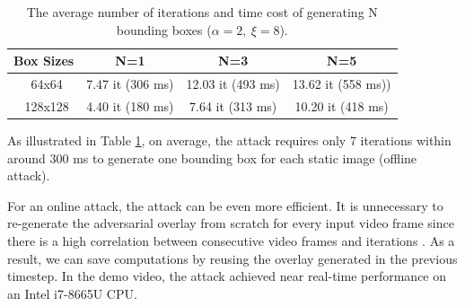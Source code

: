 \begin{table}[H]
    \centering
    \begin{tabular}{cccc}
    \hline
    Box Sizes & N=1 & N=3 & N=5\\
    \hline
    \ 64x64    & 7.47 it (306 ms)  & 12.03 it (493 ms) &  13.62 it (558 ms)) \\
    \ 128x128  & 4.40 it (180 ms)  & 7.64 it (313 ms) & 10.20 it (418 ms) \\
    \hline
    \end{tabular}
    \caption{The average number of iterations and time cost of generating N bounding boxes ($\alpha=2,\ \xi=8$).}
    \label{tab:fix-box}
\end{table}

As illustrated in Table \ref{tab:fix-box}, on average, the attack requires only 7 iterations within around 300 ms to generate one bounding box for each static image (offline attack). 

For an online attack, the attack can be even more efficient. It is unnecessary to re-generate the adversarial overlay from scratch for every input video frame since there is a high correlation between consecutive video frames and iterations \citep{ilyas2018prior}. As a result, we can save computations by reusing the overlay generated in the previous timestep. In the demo video, the attack achieved near real-time performance on an Intel i7-8665U CPU.

\clearpage

\null
\vfill

